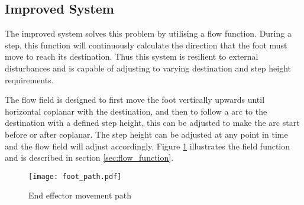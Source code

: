     \subsection{Improved System}
        The improved system solves this problem by utilising a flow function. During a step, this function will continuously calculate the
        direction that the foot must move to reach its destination. Thus this system is resilient to external disturbances and is capable of adjusting to
        varying destination and step height requirements. 
        
        The flow field is designed to first move the foot vertically upwards until horizontal coplanar with the destination, and then to follow a
        arc to the destination with a defined step height, this can be adjusted to make the arc start before or after coplanar. The step height can be adjusted at any point in time and the flow field will adjust accordingly.
        Figure \ref{fig:foot_arc} illustrates the field function and is described in section \ref{sec:flow_function}.
        \begin{figure}[h]
            \centering
            \hspace{-1.38cm}
            \texttt{[image: foot\_path.pdf]}
            \caption{End effector movement path}
            \label{fig:foot_arc}
        \end{figure}

